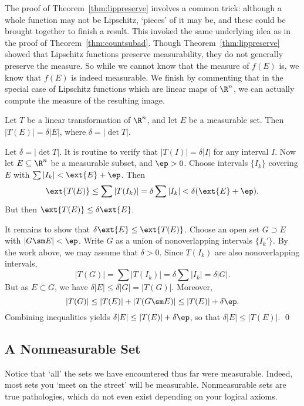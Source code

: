 The proof of Theorem~\ref{thm:lippreserve} involves a common trick: although a whole function may not be Lipschitz, `pieces' of it may be, and these could be brought together to finish a result. This invoked the same underlying idea as in the proof of Theorem~\ref{thm:countsubad}. Though Theorem~\ref{thm:lippreserve} showed that Lipschitz functions preserve measurability, they do not generally preserve the measure. So while we cannot know that the measure of $f(E)$ is, we know that $f(E)$ is indeed measurable. We finish by commenting that in the special case of Lipschitz functions which are linear maps of $\R^n$, we can actually compute the measure of the resulting image.


\begin{thm}
Let $T$ be a linear transformation of $\R^n$, and let $E$ be a measurable set. Then $|T(E)|= \delta |E|$, where $\delta= |\det T|$. 
\end{thm}

\pf Let $\delta= |\det T|$. It is routine to verify that $|T(I)|= \delta |I|$ for any interval $I$. Now let $E \subseteq \R^n$ be a measurable subset, and $\ep>0$. Choose intervals $\{I_k\}$ covering $E$ with $\sum |I_k| < \ext{E}+\ep$. Then
	\[
	\ext{T(E)} \leq \sum |T(I_k)|= \delta \sum |I_k| < \delta(\ext{E}+\ep).
	\]
But then $\ext{T(E)} \leq \delta \ext{E}$. 

It remains to show that $\delta \ext{E} \leq \ext{T(E)}$. Choose an open set $G \supset E$ with $|G \sm E|<\ep$. Write $G$ as a union of nonoverlapping intervals $\{I_k'\}$. By the work above, we may assume that $\delta>0$. Since $T(I_k)$ are also nonoverlapping intervals, 
	\[
	|T(G)|= \sum |T(I_k)| = \delta \sum |I_k| = \delta |G|.
	\]
But as $E \subset G$, we have $\delta |E| \leq \delta |G|= |T(G)|$. Moreover,
	\[
	|T(G)| \leq |T(E)| + |T(G \sm E)| \leq |T(E)| + \delta \ep.
	\]
Combining inequalities yields $\delta |E| \leq |T(E)| + \delta \ep$, so that $\delta |E| \leq |T(E)|$. \qed \\



\subsection{A Nonmeasurable Set}


Notice that `all' the sets we have encountered thus far were measurable. Indeed, most sets you `meet on the street' will be measurable. Nonmeasurable sets are true pathologies, which do not even exist depending on your logical axioms. 



